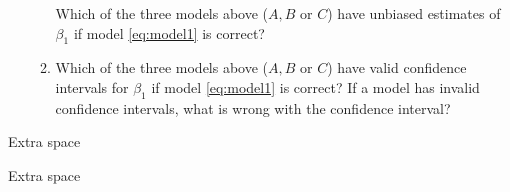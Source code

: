 \documentclass{article}
\begin{document}
\begin{enumerate}
\begin{enumerate}
\newpage

Which of the three models above ($A,B$ or $C$) have unbiased estimates of $\beta_1$ if model \eqref{eq:model1} is correct?

\vspace{3in}


\item Which of the three models above ($A,B$ or $C$) have valid confidence intervals
for $\beta_1$ if model \eqref{eq:model1} is correct? If a model has invalid
confidence intervals, what is wrong with the confidence interval?


\end{enumerate}

\end{enumerate}

   \newpage
   {\sc Extra space}

   \newpage
   {\sc Extra space}
\end{document}
